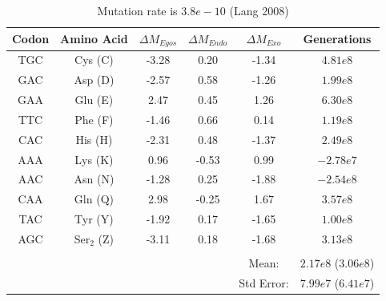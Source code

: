 \documentclass[12pt]{article}
\begin{document}
\begin{table}
\centering
\begin{tabular}{ | c | c | c | c | c | c | }
\hline
	Codon & Amino Acid & $\Delta M_{Egos}$ & $\Delta M_{Endo}$ & $\Delta M_{Exo}$ & Generations \\ \hline
	TGC & Cys (C) & -3.28 & 0.20 & -1.34 & $4.81e8$ \\ \hline
	GAC & Asp (D) & -2.57 & 0.58 & -1.26  & $1.99e8$ \\ \hline
	GAA & Glu (E) & 2.47 & 0.45 & 1.26 & $6.30e8$ \\ \hline
	TTC & Phe (F) & -1.46 & 0.66 & 0.14  & $1.19e8$ \\ \hline
	CAC & His (H) & -2.31 & 0.48 & -1.37  & $2.49e8$ \\ \hline
	AAA & Lys (K) & 0.96 & -0.53 & 0.99 & $-2.78e7$ \\ \hline
	AAC & Asn (N) & -1.28 & 0.25 & -1.88 & $-2.54e8$ \\ \hline
	CAA & Gln (Q) & 2.98 & -0.25 & 1.67 & $3.57e8$ \\ \hline
	TAC & Tyr (Y) & -1.92 & 0.17 & -1.65 & $1.00e8$ \\ \hline
	AGC & Ser$_2 $ (Z) & -3.11 & 0.18 & -1.68 & $3.13e8$ \\ \hline
	& & & & &    \\ \hline
	& & & & Mean: & $2.17e8$ ($3.06e8$) \\ \hline
	& & & & Std Error: & $7.99e7$ ($6.41e7$) \\ \hline
\end{tabular}
\caption{Mutation rate is $3.8e-10$ (Lang 2008)}
\label{tab:intro_age}
\end{table}
\end{document}
